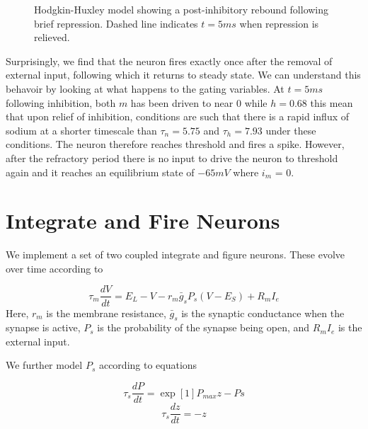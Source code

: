 \documentclass{article}
\begin{document}
\begin{figure}[h]
\caption{Hodgkin-Huxley model showing a post-inhibitory rebound following brief repression. Dashed line indicates $t=5ms$ when repression is relieved.}
\label{fig:hh_jump}
\end{figure}

Surprisingly, we find that the neuron fires exactly once after the removal of external input, following which it returns to steady state. We can understand this behavoir by looking at what happens to the gating variables. At $t=5ms$ following inhibition, both $m$ has been driven to near $0$ while $h=0.68$ this mean that upon relief of inhibition, conditions are such that there is a rapid influx of sodium at a shorter timescale than $\tau_n = 5.75$ and $\tau_h=7.93$ under these conditions. The neuron therefore reaches threshold and fires a spike. However, after the refractory period there is no input to drive the neuron to threshold again and it reaches an equilibrium state of $-65 mV$ where $i_m$ = 0.

\section{Integrate and Fire Neurons}

We implement a set of two coupled integrate and figure neurons. These evolve over time according to

\begin{equation}
\tau_m \dfrac{dV}{dt} = E_L - V - r_m \bar g_s P_s(V-E_S) + R_m I_e
\end{equation}
Here, $r_m$ is the membrane resistance, $\bar g_s$ is the synaptic conductance when the synapse is active, $P_s$ is the probability of the synapse being open, and $R_mI_e$ is the external input.

We further model $P_s$ according to equations

\begin{equation}
\tau_s \dfrac{dP}{dt} = \exp{[1]}P_{max}z-Ps
\end{equation}
\begin{equation}
\tau_s \dfrac{dz}{dt} = -z
\end{equation}
\end{document}
